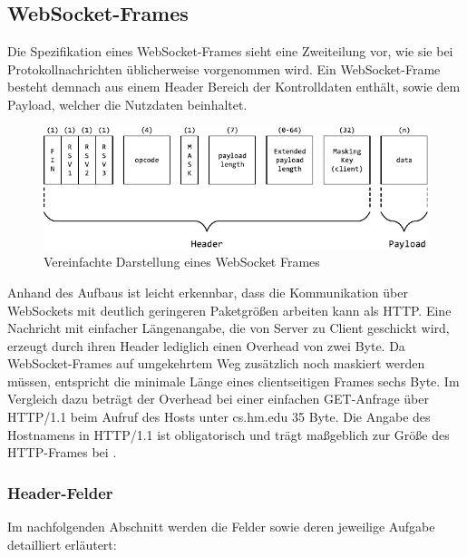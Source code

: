 \documentclass[11pt,a4paper,titlepage]{scrartcl}
\numberwithin{equation}{section}
\begin{document}
\subsection{WebSocket-Frames}\label{subsec:wsFrames}
Die Spezifikation eines WebSocket-Frames sieht eine Zweiteilung vor, wie sie bei Protokollnachrichten üblicherweise vorgenommen wird. Ein WebSocket-Frame besteht demnach aus einem Header Bereich der Kontrolldaten enthält, sowie dem Payload, welcher die Nutzdaten beinhaltet.\vspace{2mm}
\begin{figure}[ht] \label{fig:wsFrame}
	\begin{center}
		\includegraphics[scale=1.25]{img/frame.pdf}
		\caption{Vereinfachte Darstellung eines WebSocket Frames}
	\end{center}
\end{figure}
Anhand des Aufbaus ist leicht erkennbar, dass die Kommunikation über WebSockets mit deutlich geringeren Paketgrößen arbeiten kann als HTTP. Eine Nachricht mit einfacher Längenangabe, die von Server zu Client geschickt wird, erzeugt durch ihren Header lediglich einen Overhead von zwei Byte. Da WebSocket-Frames auf umgekehrtem Weg zusätzlich noch maskiert werden müssen, entspricht die minimale Länge eines clientseitigen Frames sechs Byte. Im Vergleich dazu beträgt der Overhead bei einer einfachen GET-Anfrage über HTTP/1.1 beim Aufruf des Hosts unter cs.hm.edu 35 Byte. Die Angabe des Hostnamens in HTTP/1.1 ist obligatorisch und trägt maßgeblich zur Größe des HTTP-Frames bei \autocite[128]{leach_hypertext_1999}. 

\subsubsection{Header-Felder}\label{subsubsec:wsHeader}
Im nachfolgenden Abschnitt werden die Felder sowie deren jeweilige Aufgabe detailliert erläutert:
\end{document}
